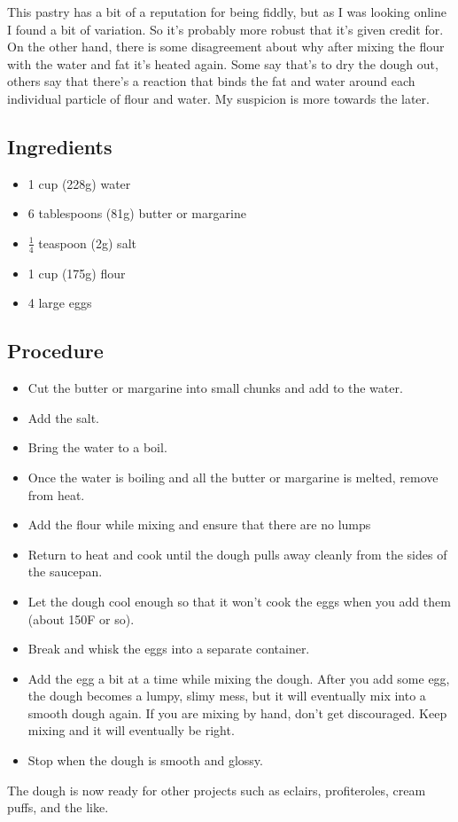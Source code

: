 \documentclass[10pt, openany]{book}
\begin{document}
This pastry has a bit of a reputation for being fiddly, but as I was looking online I found a bit of variation.  So it's probably more robust that it's given credit for.  On the other hand, there is some disagreement about why after mixing the flour with the water and fat it's heated again.  Some say that's to dry the dough out, others say that there's a reaction that binds the fat and water around each individual particle of flour and water.  My suspicion is more towards the later.

\subsection{Ingredients}
\begin{itemize}
  \item 1 cup (228g) water
  \item 6 tablespoons (81g) butter or margarine
  \item $\frac{1}{4}$ teaspoon (2g) salt
  \item 1 cup (175g) flour
  \item 4 large eggs
\end{itemize}
\subsection{Procedure}
\begin{itemize}
  \item Cut the butter or margarine into small chunks and add to the water.
  \item Add the salt.
  \item Bring the water to a boil.
  \item Once the water is boiling and all the butter or margarine is melted, remove from heat.
  \item Add the flour while mixing and ensure that there are no lumps
  \item Return to heat and cook until the dough pulls away cleanly from the sides of the saucepan.
  \item Let the dough cool enough so that it won't cook the eggs when you add them (about 150\degree{}F or so).
  \item Break and whisk the eggs into a separate container.
  \item Add the egg a bit at a time while mixing the dough.  After you add some egg, the dough becomes a lumpy, slimy mess, but it will eventually mix into a smooth dough again.  If you are mixing by hand, don't get discouraged.  Keep mixing and it will eventually be right.
  \item Stop when the dough is smooth and glossy.
\end{itemize}
The dough is now ready for other projects such as eclairs, profiteroles, cream puffs, and the like.
\end{document}
